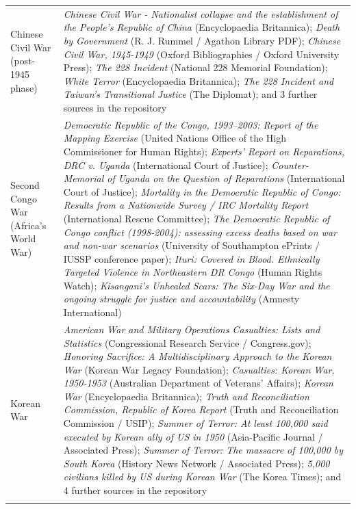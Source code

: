 \documentclass[11pt]{article}
\begin{document}
\begin{scriptsize}
\begin{longtable}{p{3.5cm} p{12.5cm}}
\addlinespace
Chinese Civil War (post-1945 phase) & \emph{Chinese Civil War - Nationalist collapse and the establishment of the People's Republic of China} (Encyclopaedia Britannica); \emph{Death by Government} (R. J. Rummel / Agathon Library PDF); \emph{Chinese Civil War, 1945-1949} (Oxford Bibliographies / Oxford University Press); \emph{The 228 Incident} (National 228 Memorial Foundation); \emph{White Terror} (Encyclopaedia Britannica); \emph{The 228 Incident and Taiwan's Transitional Justice} (The Diplomat); and 3 further sources in the repository \\
\addlinespace
Second Congo War (Africa's World War) & \emph{Democratic Republic of the Congo, 1993–2003: Report of the Mapping Exercise} (United Nations Office of the High Commissioner for Human Rights); \emph{Experts' Report on Reparations, DRC v. Uganda} (International Court of Justice); \emph{Counter-Memorial of Uganda on the Question of Reparations} (International Court of Justice); \emph{Mortality in the Democratic Republic of Congo: Results from a Nationwide Survey / IRC Mortality Report} (International Rescue Committee); \emph{The Democratic Republic of Congo conflict (1998-2004): assessing excess deaths based on war and non-war scenarios} (University of Southampton ePrints / IUSSP conference paper); \emph{Ituri: Covered in Blood. Ethnically Targeted Violence in Northeastern DR Congo} (Human Rights Watch); \emph{Kisangani's Unhealed Scars: The Six-Day War and the ongoing struggle for justice and accountability} (Amnesty International) \\
\addlinespace
Korean War & \emph{American War and Military Operations Casualties: Lists and Statistics} (Congressional Research Service / Congress.gov); \emph{Honoring Sacrifice: A Multidisciplinary Approach to the Korean War} (Korean War Legacy Foundation); \emph{Casualties: Korean War, 1950-1953} (Australian Department of Veterans' Affairs); \emph{Korean War} (Encyclopaedia Britannica); \emph{Truth and Reconciliation Commission, Republic of Korea Report} (Truth and Reconciliation Commission / USIP); \emph{Summer of Terror: At least 100,000 said executed by Korean ally of US in 1950} (Asia-Pacific Journal / Associated Press); \emph{Summer of Terror: The massacre of 100,000 by South Korea} (History News Network / Associated Press); \emph{5,000 civilians killed by US during Korean War} (The Korea Times); and 4 further sources in the repository \\
\addlinespace

\end{longtable}
\end{scriptsize}
\end{document}
